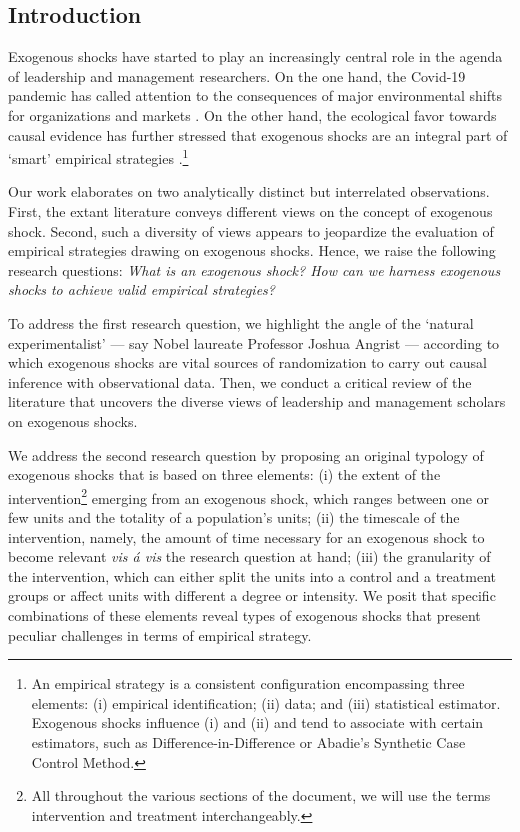 \clearpage

\begin{refsection}

\section{Introduction}
\label{sec:introduction}

\noindent Exogenous shocks have started to play an increasingly central role in
the agenda of leadership and management researchers. On the one hand, the
Covid-19 pandemic has called attention to the consequences of major
environmental shifts for organizations \autocite{kniffin_et_al_2021} and markets
\autocite{zhang_et_al_2020}.  On the other hand, the ecological favor towards
causal evidence has further stressed that exogenous shocks are an integral part
of `smart' empirical strategies \autocite{angrist_2022}.\footnote{An empirical
strategy is a consistent configuration encompassing three elements: (i)
empirical identification; (ii) data; and (iii) statistical estimator. Exogenous
shocks influence (i) and (ii) and tend to associate with certain estimators,
such as Difference-in-Difference or Abadie's Synthetic Case Control Method.}

Our work elaborates on two analytically distinct but interrelated observations. 
First, the extant literature conveys different views on the concept of exogenous
shock. Second, such a diversity of views appears to jeopardize the evaluation of
empirical strategies drawing on exogenous shocks.  Hence, we raise the following
research questions: \textit{What is an exogenous shock? How can we harness
exogenous shocks to achieve valid empirical strategies?}  

To address the first research question, we highlight the angle of the
`natural experimentalist' --- say Nobel laureate Professor Joshua Angrist --- 
according to which exogenous shocks are vital sources of randomization to carry
out causal inference with observational data.  Then, we conduct a critical
review of the literature that uncovers the diverse views of leadership and
management scholars on exogenous shocks. 

We address the second research question by proposing an original typology of
exogenous shocks that is based on three elements: (i) the extent of the
intervention\footnote{All throughout the various sections of the document,
we will use the terms intervention and treatment interchangeably.} emerging  
from an exogenous shock, which ranges between one or few units and the totality 
of a population's units; (ii) the timescale of the intervention, namely, 
the amount of time necessary for an exogenous shock to become relevant 
\textit{vis \'a vis} the research question at hand; (iii) the granularity 
of the intervention, which can either split the units into a control and a 
treatment groups or affect units with different a degree or intensity. 
We posit that specific combinations of these elements reveal types 
of exogenous shocks that present peculiar challenges in terms of 
empirical strategy.


\end{refsection}
